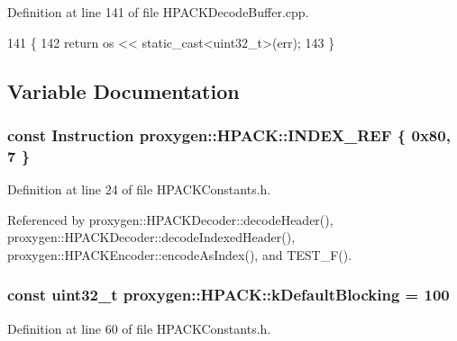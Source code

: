 Definition at line 141 of file H\+P\+A\+C\+K\+Decode\+Buffer.\+cpp.


\begin{DoxyCode}
141                                                         \{
142   \textcolor{keywordflow}{return} os << static\_cast<uint32\_t>(err);
143 \}
\end{DoxyCode}


\subsection{Variable Documentation}
\subsubsection[{I\+N\+D\+E\+X\+\_\+\+R\+EF}]{\setlength{\rightskip}{0pt plus 5cm}const {\bf Instruction} proxygen\+::\+H\+P\+A\+C\+K\+::\+I\+N\+D\+E\+X\+\_\+\+R\+EF \{ 0x80, 7 \}}\label{namespaceproxygen_1_1HPACK_a389cfa2dd345a25792a025b1f8418ea1}


Definition at line 24 of file H\+P\+A\+C\+K\+Constants.\+h.



Referenced by proxygen\+::\+H\+P\+A\+C\+K\+Decoder\+::decode\+Header(), proxygen\+::\+H\+P\+A\+C\+K\+Decoder\+::decode\+Indexed\+Header(), proxygen\+::\+H\+P\+A\+C\+K\+Encoder\+::encode\+As\+Index(), and T\+E\+S\+T\+\_\+\+F().

\subsubsection[{k\+Default\+Blocking}]{\setlength{\rightskip}{0pt plus 5cm}const uint32\+\_\+t proxygen\+::\+H\+P\+A\+C\+K\+::k\+Default\+Blocking = 100}\label{namespaceproxygen_1_1HPACK_a355daa230590d2aea82c59ad80ee8ba8}


Definition at line 60 of file H\+P\+A\+C\+K\+Constants.\+h.

